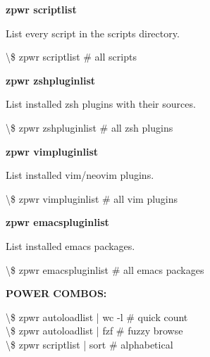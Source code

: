 \documentclass[11pt,a4paper,twoside]{book}
\begin{document}
\vspace{12pt}
{\bfseries\color{neonyellow} zpwr scriptlist}\vspace{4pt}

List every script in the scripts directory.

\begin{codebox}
\textbackslash{}\$ zpwr scriptlist              \# all scripts\\
\end{codebox}


\vspace{12pt}
{\bfseries\color{neonyellow} zpwr zshpluginlist}\vspace{4pt}

List installed zsh plugins with their sources.

\begin{codebox}
\textbackslash{}\$ zpwr zshpluginlist           \# all zsh plugins\\
\end{codebox}


\vspace{12pt}
{\bfseries\color{neonyellow} zpwr vimpluginlist}\vspace{4pt}

List installed vim/neovim plugins.

\begin{codebox}
\textbackslash{}\$ zpwr vimpluginlist           \# all vim plugins\\
\end{codebox}


\vspace{12pt}
{\bfseries\color{neonyellow} zpwr emacspluginlist}\vspace{4pt}

List installed emacs packages.

\begin{codebox}
\textbackslash{}\$ zpwr emacspluginlist         \# all emacs packages\\
\end{codebox}


\vspace{12pt}
{\bfseries\color{neonyellow} POWER COMBOS:}\vspace{4pt}

\begin{codebox}
\textbackslash{}\$ zpwr autoloadlist | wc -l    \# quick count\\
\textbackslash{}\$ zpwr autoloadlist | fzf      \# fuzzy browse\\
\textbackslash{}\$ zpwr scriptlist | sort       \# alphabetical\\
\end{codebox}
\end{document}

